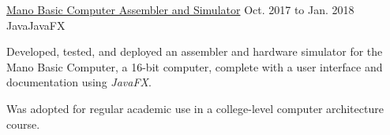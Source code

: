 \begin{comment}
    \begin{cventry}
        {\href{https://github.com/TomerAberbach/tomeraberbach.github.io}{Tomer Aberbach Static Website Generator}}{}
        {May to July 2018}
        {JavaScript, HTML, Markdown, Handlebars, CSS, SVG, YAML}{Node.js, Gulp.js}
        \begin{cvitems}
            \item Designed and developed a static website generator for my portfolio website.
            \item Automated pagination and optimized assets using transpilation and minification.
        \end{cvitems}  
    \end{cventry}
\end{comment}

\begin{comment}
    \begin{cventry}
        {\href{https://wtsr.tomeraberba.ch}{WTSR 91.3FM Web Player}}{}
        {Feb. 2018}
        {JavaScript, HTML, CSS}{Firebase, Node.js, Gulp.js, ACRCloud}
        \begin{cvitems}
            \item Designed and programmed an online web player for TCNJ's official fully student-run radio station with a \textsl{Node.js} backend.
            \item Incorporated audio controls, audio fingerprinting for real-time song identification, and Spotify song links.
            \item Won ``Best Technical Project'' at the HackTCNJ hackathon.
        \end{cvitems}
    \end{cventry}
\end{comment}

\begin{cventry}
    {\href{https://github.com/TomerAberbach/mano-simulator}{Mano Basic Computer Assembler and Simulator}}{}
    {Oct. 2017 to Jan. 2018}
    {Java}{JavaFX}
    \begin{cvitems}
        \item Developed, tested, and deployed an assembler and hardware simulator for the Mano Basic Computer, a 16-bit computer, complete with a user interface and documentation using \textsl{JavaFX}.
        \item Was adopted for regular academic use in a college-level computer architecture course.
    \end{cvitems}
\end{cventry}
